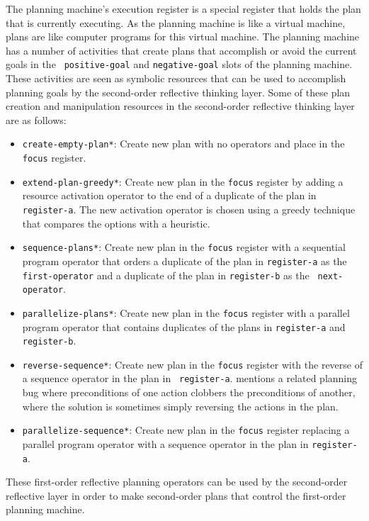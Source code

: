 The planning machine's execution register is a special register that
holds the plan that is currently executing.  As the planning machine
is like a virtual machine, plans are like computer programs for this
virtual machine.  The planning machine has a number of activities that
create plans that accomplish or avoid the current goals in the {\tt
  positive-goal} and {\tt negative-goal} slots of the planning
machine.  These activities are seen as symbolic resources that can be
used to accomplish planning goals by the second-order reflective
thinking layer.  Some of these plan creation and manipulation
resources in the second-order reflective thinking layer are as
follows:
\begin{itemize}
\item {\tt create-empty-plan*}: Create new plan with no operators and
  place in the {\tt focus} register.
\item {\tt extend-plan-greedy*}: Create new plan in the {\tt focus}
  register by adding a resource activation operator to the end of a
  duplicate of the plan in {\tt register-a}.  The new activation
  operator is chosen using a greedy technique that compares the
  options with a heuristic.
\item {\tt sequence-plans*}: Create new plan in the {\tt focus}
  register with a sequential program operator that orders a duplicate
  of the plan in {\tt register-a} as the {\tt first-operator} and a
  duplicate of the plan in {\tt register-b} as the {\tt
    next-operator}.
\item {\tt parallelize-plans*}: Create new plan in the {\tt focus}
  register with a parallel program operator that contains duplicates
  of the plans in {\tt register-a} and {\tt register-b}.
\item {\tt reverse-sequence*}: Create new plan in the {\tt focus}
  register with the reverse of a sequence operator in the plan in {\tt
    register-a}.  \cite{sussman:1973} mentions a related planning bug
  where preconditions of one action clobbers the preconditions of
  another, where the solution is sometimes simply reversing the
  actions in the plan.
\item {\tt parallelize-sequence*}: Create new plan in the {\tt focus}
  register replacing a parallel program operator with a sequence
  operator in the plan in {\tt register-a}.
\end{itemize}
These first-order reflective planning operators can be used by the
second-order reflective layer in order to make second-order plans that
control the first-order planning machine.

